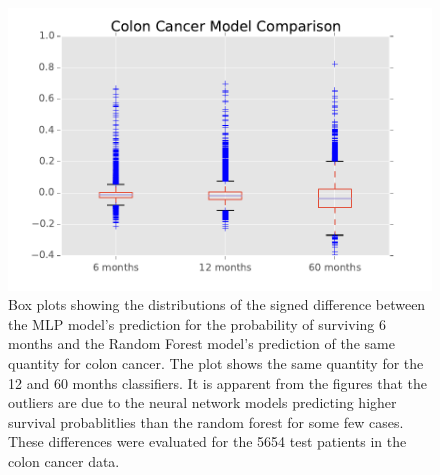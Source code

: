\documentclass[a4paper,11pt]{article}
\begin{document}
\begin{figure}[tbp]
\centering 
\begin{center}
\includegraphics[width=.90\textwidth,origin=c]{colonbox.pdf}
\caption{\label{fig:colonbox} Box plots showing the distributions of the signed difference between the MLP model's prediction for the probability of surviving 6 months and the Random Forest model's prediction of the same quantity for colon cancer. The plot shows the same quantity for the 12 and 60 months classifiers. It is apparent from the figures that the outliers are due to the neural network models predicting higher survival probablitlies than the random forest for some few cases. These differences were evaluated for the 5654 test patients in the colon cancer data.}
\end{center}
\end{figure}


\end{document}
